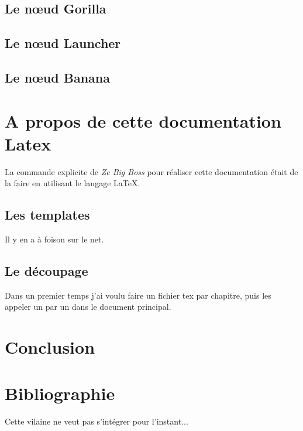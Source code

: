 \documentclass{tstextbook}
\begin{document}
\section{Le nœud Gorilla}
\section{Le nœud Launcher}
\section{Le nœud Banana}

	

	
\chapter{A propos de cette documentation Latex}
\begin{summary}
La commande explicite de \emph{Ze Big Boss} pour réaliser cette documentation était de la faire en utilisant le langage \LaTeX.
\end{summary}

\section{Les templates}
Il y en a à foison sur le net.
\section{Le découpage}
Dans un premier temps j'ai voulu faire un fichier tex par chapitre, puis les appeler un par un dans le document principal.



\chapter{Conclusion}





\chapter*{Bibliographie}
Cette vilaine ne veut pas s'intégrer pour l'instant...
\printbibliography{}


\printindex
\end{document}
